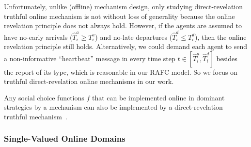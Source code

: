 \documentclass[11pt]{phdthesis}
\begin{document}

Unfortunately, unlike (offline) mechanism design, only studying direct-revelation truthful online mechanism is not without loss of generality because the online revelation principle does not always hold. However, if the agents are assumed to have no-early arrivals ($ \hat{T}_i^a \geq T_i^a $) and no-late departures ($ \hat{T}_i^d \leq T_i^d $), then the online revelation principle still holds. Alternatively, we could demand each agent to send a non-informative ``heartbeat'' message in every time step $ t \in [\hat{T}_i^a, \hat{T}_i^d ] $ besides the report of its type, which is reasonable in our RAFC model. So we focus on truthful direct-revelation online mechanisms in our work. 


\begin{proposition}
	Any social choice functions $f$ that can be implemented online in dominant strategies by a mechanism can also be implemented by a direct-revelation truthful mechanism~\citep[Theorem 1]{friedman2003pricing}.
\end{proposition}

\subsubsection{Single-Valued Online Domains} \label{single-valued online domains}
\end{document}
